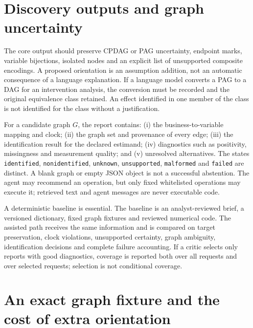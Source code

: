 \section{Discovery outputs and graph uncertainty}

The core output should preserve CPDAG or PAG uncertainty, endpoint marks, variable bijections, isolated nodes and an explicit list of unsupported composite encodings. A proposed orientation is an assumption addition, not an automatic consequence of a language explanation. If a language model converts a PAG to a DAG for an intervention analysis, the conversion must be recorded and the original equivalence class retained. An effect identified in one member of the class is not identified for the class without a justification.

For a candidate graph $G$, the report contains: (i) the business-to-variable mapping and clock; (ii) the graph set and provenance of every edge; (iii) the identification result for the declared estimand; (iv) diagnostics such as positivity, missingness and measurement quality; and (v) unresolved alternatives. The states \texttt{identified}, \texttt{nonidentified}, \texttt{unknown}, \texttt{unsupported}, \texttt{malformed} and \texttt{failed} are distinct. A blank graph or empty JSON object is not a successful abstention. The agent may recommend an operation, but only fixed whitelisted operations may execute it; retrieved text and agent messages are never executable code.

A deterministic baseline is essential. The baseline is an analyst-reviewed brief, a versioned dictionary, fixed graph fixtures and reviewed numerical code. The assisted path receives the same information and is compared on target preservation, clock violations, unsupported certainty, graph ambiguity, identification decisions and complete failure accounting. If a critic selects only reports with good diagnostics, coverage is reported both over all requests and over selected requests; selection is not conditional coverage.


\section{An exact graph fixture and the cost of extra orientation}

